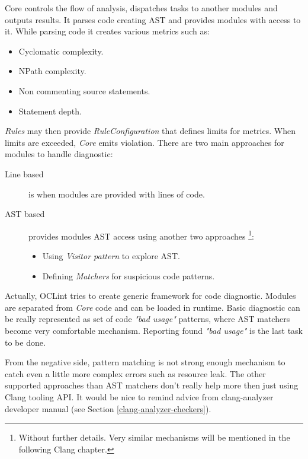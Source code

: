 Core controls the flow of analysis, dispatches tasks to another modules and outputs results. It parses code creating AST and provides modules with access to it. While parsing code it creates various metrics such as:

\begin{itemize}
\item Cyclomatic complexity.
\item NPath complexity.
\item Non commenting source statements.
\item Statement depth.
\end{itemize}

\emph{Rules} may then provide \emph{RuleConfiguration} that defines limits for metrics. When limits  are exceeded, \emph{Core} emits violation. There are two main approaches for modules to handle diagnostic:

\begin{description}
\item[Line based] is when modules are provided with lines of code.
\item[AST based] provides modules AST access using another two approaches  \footnote{Without further details. Very similar mechanisms will be mentioned in the following Clang chapter.}:
	\begin{itemize}
	\item Using \emph{Visitor pattern} to explore AST.
	\item Defining \emph{Matchers} for suspicious code patterns.
	\end{itemize}
\end{description}

Actually, OCLint tries to create generic framework for code diagnostic. Modules are separated from \emph{Core} code and can be loaded in runtime. Basic diagnostic can be really represented as set of code \textit{"bad usage"} patterns, where AST matchers become very comfortable mechanism. Reporting found \textit{"bad usage"} is the last task to be done.

From the negative side, pattern matching is not strong enough mechanism to catch even a little more complex errors such as resource leak. The other supported approaches than AST matchers don't really help more then just using Clang tooling API. It would be nice to remind advice from clang-analyzer developer manual (see Section \ref{clang-analyzer-checkers}).

